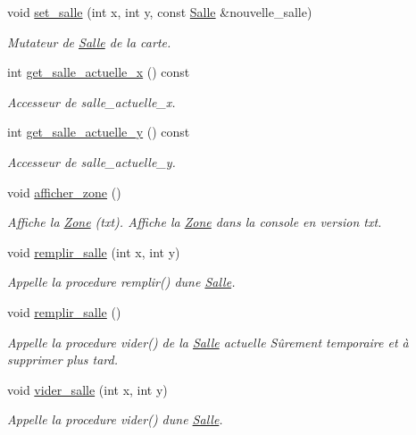 \begin{DoxyCompactItemize}
void \hyperlink{classZone_a5c68a620d5c32cd2bf26272aeaee557d}{set\+\_\+salle} (int x, int y, const \hyperlink{classSalle}{Salle} \&nouvelle\+\_\+salle)
\begin{DoxyCompactList}\small\item\em Mutateur de \hyperlink{classSalle}{Salle} de la {\itshape carte}. \end{DoxyCompactList}\item 
int \hyperlink{classZone_a5cba037223549a19e4717c9a502895ca}{get\+\_\+salle\+\_\+actuelle\+\_\+x} () const 
\begin{DoxyCompactList}\small\item\em Accesseur de {\itshape salle\+\_\+actuelle\+\_\+x}. \end{DoxyCompactList}\item 
int \hyperlink{classZone_a481d145df776bb245a223e6848b9a6d6}{get\+\_\+salle\+\_\+actuelle\+\_\+y} () const 
\begin{DoxyCompactList}\small\item\em Accesseur de {\itshape salle\+\_\+actuelle\+\_\+y}. \end{DoxyCompactList}\item 
void \hyperlink{classZone_ae7fc481efb7e4bb2fc28bb5da0bbaf90}{afficher\+\_\+zone} ()
\begin{DoxyCompactList}\small\item\em Affiche la \hyperlink{classZone}{Zone} (txt). Affiche la \hyperlink{classZone}{Zone} dans la console en version txt. \end{DoxyCompactList}\item 
void \hyperlink{classZone_ae97ba3cc2a452803a66dbd3c0c84852b}{remplir\+\_\+salle} (int x, int y)
\begin{DoxyCompactList}\small\item\em Appelle la procedure remplir() d\textquotesingle{}une \hyperlink{classSalle}{Salle}. \end{DoxyCompactList}\item 
void \hyperlink{classZone_a76284023033d6b67f933b4656a8eb761}{remplir\+\_\+salle} ()
\begin{DoxyCompactList}\small\item\em Appelle la procedure vider() de la \hyperlink{classSalle}{Salle} actuelle Sûrement temporaire et à supprimer plus tard. \end{DoxyCompactList}\item 
void \hyperlink{classZone_a296f45a66db2f5ad565d15274f628e72}{vider\+\_\+salle} (int x, int y)
\begin{DoxyCompactList}\small\item\em Appelle la procedure vider() d\textquotesingle{}une \hyperlink{classSalle}{Salle}. \end{DoxyCompactList}\item 

\end{DoxyCompactItemize}
